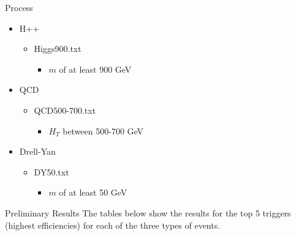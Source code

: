 \documentclass[final]{beamer}
\newlength{\colwidth}
\begin{document}
\begin{frame}[t]
\begin{columns}[t]
\begin{column}{\colwidth}
\begin{block}{Process}
    \begin{itemize}
        \item H++
        \begin{itemize}
            \item Higgs900.txt
            \begin{itemize}
                \item $m$ of at least 900 GeV
            \end{itemize}
        \end{itemize}
        \item QCD
        \begin{itemize}
            \item QCD500-700.txt
            \begin{itemize}
                \item $H_T$ between 500-700 GeV
            \end{itemize}
        \end{itemize}
        \item Drell-Yan
        \begin{itemize}
            \item DY50.txt
            \begin{itemize}
                \item $m$ of at least 50 GeV
            \end{itemize}
        \end{itemize}
    \end{itemize}
  \end{block}

  \begin{block}{Preliminary Results}
    The tables below show the results for the top 5 triggers (highest efficiencies) for each of the three types of events.


\end{block}
\end{column}
\end{columns}
\end{frame}
\end{document}
